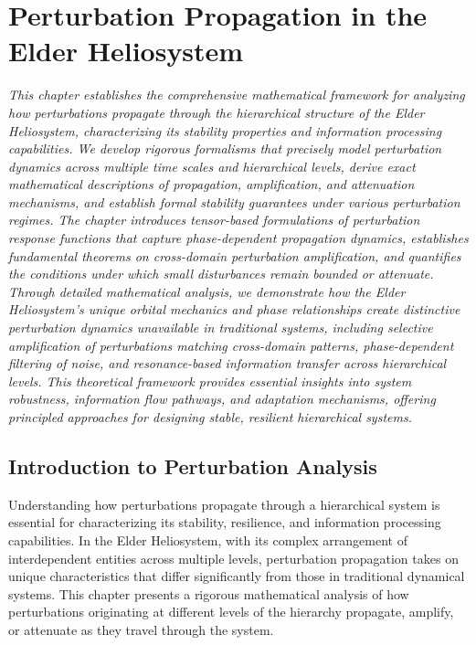 \chapter{Perturbation Propagation in the Elder Heliosystem}

\textit{This chapter establishes the comprehensive mathematical framework for analyzing how perturbations propagate through the hierarchical structure of the Elder Heliosystem, characterizing its stability properties and information processing capabilities. We develop rigorous formalisms that precisely model perturbation dynamics across multiple time scales and hierarchical levels, derive exact mathematical descriptions of propagation, amplification, and attenuation mechanisms, and establish formal stability guarantees under various perturbation regimes. The chapter introduces tensor-based formulations of perturbation response functions that capture phase-dependent propagation dynamics, establishes fundamental theorems on cross-domain perturbation amplification, and quantifies the conditions under which small disturbances remain bounded or attenuate. Through detailed mathematical analysis, we demonstrate how the Elder Heliosystem's unique orbital mechanics and phase relationships create distinctive perturbation dynamics unavailable in traditional systems, including selective amplification of perturbations matching cross-domain patterns, phase-dependent filtering of noise, and resonance-based information transfer across hierarchical levels. This theoretical framework provides essential insights into system robustness, information flow pathways, and adaptation mechanisms, offering principled approaches for designing stable, resilient hierarchical systems.}

\section{Introduction to Perturbation Analysis}

Understanding how perturbations propagate through a hierarchical system is essential for characterizing its stability, resilience, and information processing capabilities. In the Elder Heliosystem, with its complex arrangement of interdependent entities across multiple levels, perturbation propagation takes on unique characteristics that differ significantly from those in traditional dynamical systems. This chapter presents a rigorous mathematical analysis of how perturbations originating at different levels of the hierarchy propagate, amplify, or attenuate as they travel through the system.

